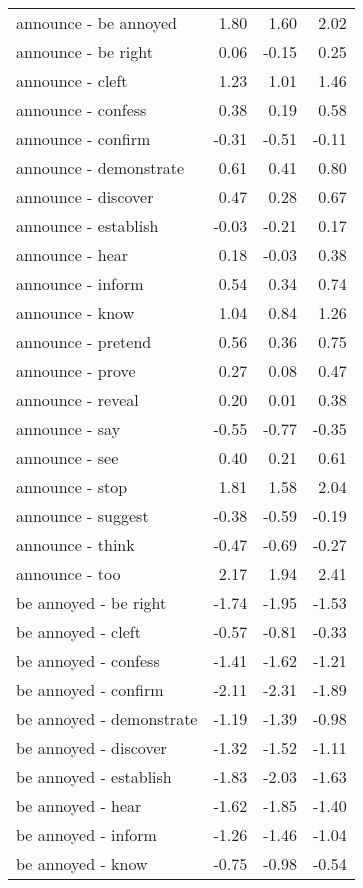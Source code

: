 \begin{longtable}{lrrr}
  announce - be annoyed & 1.80 & 1.60 & 2.02 \\ 
  announce - be right & 0.06 & -0.15 & 0.25 \\ 
  announce - cleft & 1.23 & 1.01 & 1.46 \\ 
  announce - confess & 0.38 & 0.19 & 0.58 \\ 
  announce - confirm & -0.31 & -0.51 & -0.11 \\ 
  announce - demonstrate & 0.61 & 0.41 & 0.80 \\ 
  announce - discover & 0.47 & 0.28 & 0.67 \\ 
  announce - establish & -0.03 & -0.21 & 0.17 \\ 
  announce - hear & 0.18 & -0.03 & 0.38 \\ 
  announce - inform & 0.54 & 0.34 & 0.74 \\ 
  announce - know & 1.04 & 0.84 & 1.26 \\ 
  announce - pretend & 0.56 & 0.36 & 0.75 \\ 
  announce - prove & 0.27 & 0.08 & 0.47 \\ 
  announce - reveal & 0.20 & 0.01 & 0.38 \\ 
  announce - say & -0.55 & -0.77 & -0.35 \\ 
  announce - see & 0.40 & 0.21 & 0.61 \\ 
  announce - stop & 1.81 & 1.58 & 2.04 \\ 
  announce - suggest & -0.38 & -0.59 & -0.19 \\ 
  announce - think & -0.47 & -0.69 & -0.27 \\ 
  announce - too & 2.17 & 1.94 & 2.41 \\ 
  be annoyed - be right & -1.74 & -1.95 & -1.53 \\ 
  be annoyed - cleft & -0.57 & -0.81 & -0.33 \\ 
  be annoyed - confess & -1.41 & -1.62 & -1.21 \\ 
  be annoyed - confirm & -2.11 & -2.31 & -1.89 \\ 
  be annoyed - demonstrate & -1.19 & -1.39 & -0.98 \\ 
  be annoyed - discover & -1.32 & -1.52 & -1.11 \\ 
  be annoyed - establish & -1.83 & -2.03 & -1.63 \\ 
  be annoyed - hear & -1.62 & -1.85 & -1.40 \\ 
  be annoyed - inform & -1.26 & -1.46 & -1.04 \\ 
  be annoyed - know & -0.75 & -0.98 & -0.54 \\ 

\end{longtable}
